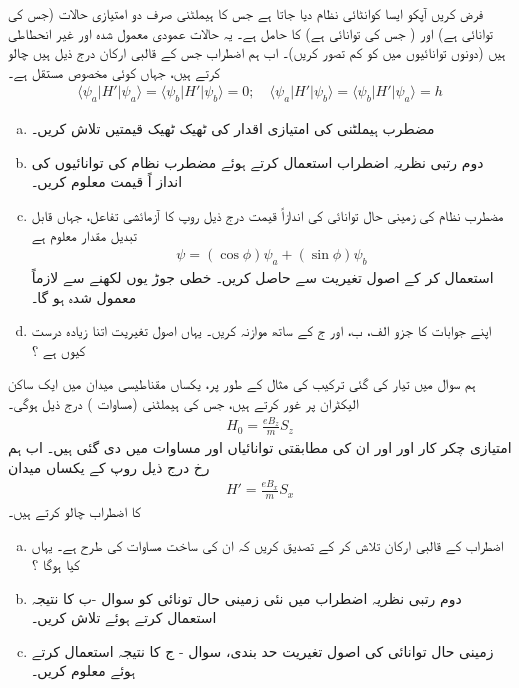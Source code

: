 فرض کریں آپکو ایسا کوانٹائی نظام دیا جاتا ہے جس کا ہیملٹنی  صرف دو امتیازی حالات  (جس کی توانائی  ہے) اور  ( جس کی توانائی  ہے) کا حامل ہے۔ یہ حالات عمودی معمول شدہ اور غیر انحطاطی ہیں (دونوں توانائیوں میں  کو کم تصور کریں)۔ اب ہم اضطراب  جس کے قالبی ارکان درج ذیل ہیں چالو کرتے ہیں، جہاں  کوئی مخصوص مستقل ہے۔
\begin{align}\label{مساوات_تغیریت_قالبی_ارکان_دیے_گئے}
\langle \psi_{a}|H'|\psi_{a}\rangle=\langle \psi_{b}|H'|\psi_{b}\rangle=0; \quad \langle \psi_{a}|H'|\psi_{b}\rangle=\langle \psi_{b}|H'|\psi_{a}\rangle=h
\end{align}
\begin{enumerate}[a.]
\item
 مضطرب ہیملٹنی کی امتیازی اقدار کی ٹھیک ٹھیک قیمتیں تلاش کریں۔
\item
دوم رتبی نظریہ اضطراب استعمال کرتے ہوئے مضطرب نظام کی توانائیوں کی انداز اً قیمت معلوم کریں۔
\item
 مضطرب نظام کی زمینی حال توانائی کی اندازاً قیمت درج ذیل روپ کا آزمائشی تفاعل، جہاں  قابل تبدیل مقدار معلوم ہے 
\begin{align}
\psi=(\cos{\phi})\psi_{a}+(\sin{\phi})\psi_{b} 
\end{align}
 استعمال کر کے اصول تغیریت سے حاصل کریں۔  خطی جوڑ یوں لکھنے سے  لازماً معمول شدہ ہو گا۔
\item
 اپنے جوابات کا جزو الف، ب، اور ج کے ساتھ موازنہ کریں۔ یہاں اصول تغیریت اتنا زیادہ درست کیوں ہے ؟
 \end{enumerate}
ہم سوال  میں تیار کی گئی ترکیب کی مثال کے طور پر، یکساں مقناطیسی میدان  میں ایک ساکن الیکٹران پر غور کرتے ہیں، جس کی ہیملٹنی (مساوات ) درج ذیل ہوگی۔
\begin{align}
H_{0}=\frac{eB_{z}}{m}S_{z} 
\end{align}
 امتیازی چکر کار  اور  اور ان کی مطابقتی توانائیاں  اور  مساوات  میں دی گئی ہیں۔ اب ہم  رخ درج ذیل روپ کے یکساں میدان
\begin{align}
H'=\frac{eB_{x}}{m}S_{x} 
\end{align}
 کا اضطراب چالو کرتے ہیں۔
 \begin{enumerate}[a.]
\item
 اضطراب  کے قالبی ارکان تلاش کر کے تصدیق کریں کہ ان کی ساخت مساوات  کی طرح ہے۔ یہاں  کیا ہوگا ؟
\item
 دوم رتبی نظریہ اضطراب میں نئی زمینی حال تونائی کو سوال -ب کا نتیجہ استعمال کرتے ہوئے تلاش کریں۔
\item
 زمینی حال توانائی کی اصول تغیریت حد بندی، سوال - ج کا نتیجہ استعمال کرتے ہوئے معلوم کریں۔
 \end{enumerate}
